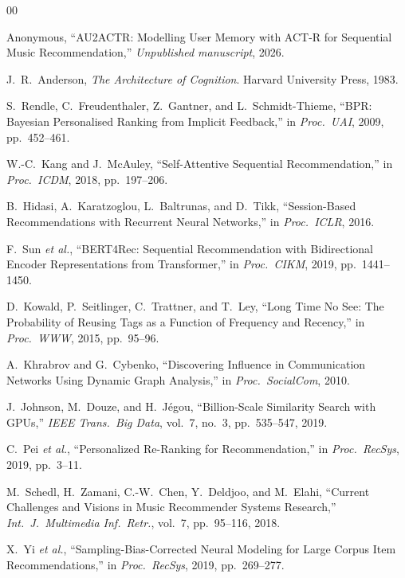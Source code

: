 \documentclass[conference]{IEEEtran}
\begin{document}
\begin{thebibliography}{00}

Anonymous, ``AU2ACTR: Modelling User Memory with ACT-R for
Sequential Music Recommendation,'' \textit{Unpublished manuscript},
2026.

J.~R.~Anderson, \textit{The Architecture of Cognition}.
Harvard University Press, 1983.

S.~Rendle, C.~Freudenthaler, Z.~Gantner, and L.~Schmidt-Thieme,
``BPR: Bayesian Personalised Ranking from Implicit Feedback,''
in \textit{Proc.\ UAI}, 2009, pp.\ 452--461.

W.-C.~Kang and J.~McAuley, ``Self-Attentive Sequential
Recommendation,'' in \textit{Proc.\ ICDM}, 2018, pp.\ 197--206.

B.~Hidasi, A.~Karatzoglou, L.~Baltrunas, and D.~Tikk,
``Session-Based Recommendations with Recurrent Neural Networks,''
in \textit{Proc.\ ICLR}, 2016.

F.~Sun \textit{et al.}, ``BERT4Rec: Sequential Recommendation
with Bidirectional Encoder Representations from Transformer,''
in \textit{Proc.\ CIKM}, 2019, pp.\ 1441--1450.

D.~Kowald, P.~Seitlinger, C.~Trattner, and T.~Ley,
``Long Time No See: The Probability of Reusing Tags as a Function
of Frequency and Recency,'' in \textit{Proc.\ WWW}, 2015,
pp.\ 95--96.

A.~Khrabrov and G.~Cybenko, ``Discovering Influence in
Communication Networks Using Dynamic Graph Analysis,''
in \textit{Proc.\ SocialCom}, 2010.

J.~Johnson, M.~Douze, and H.~J{\'e}gou, ``Billion-Scale
Similarity Search with GPUs,'' \textit{IEEE Trans.\ Big Data},
vol.\ 7, no.\ 3, pp.\ 535--547, 2019.

C.~Pei \textit{et al.}, ``Personalized Re-Ranking for
Recommendation,'' in \textit{Proc.\ RecSys}, 2019, pp.\ 3--11.

M.~Schedl, H.~Zamani, C.-W.~Chen, Y.~Deldjoo, and
M.~Elahi, ``Current Challenges and Visions in Music Recommender
Systems Research,'' \textit{Int.\ J.\ Multimedia Inf.\ Retr.},
vol.\ 7, pp.\ 95--116, 2018.

X.~Yi \textit{et al.}, ``Sampling-Bias-Corrected Neural Modeling
for Large Corpus Item Recommendations,'' in \textit{Proc.\
RecSys}, 2019, pp.\ 269--277.

\end{thebibliography}
\end{document}
